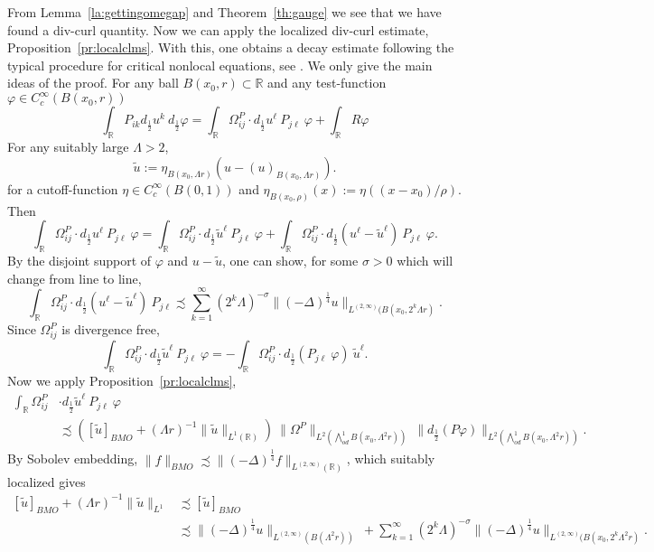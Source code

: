 \documentclass[12pt]{amsart}
\theoremstyle{definition}
\newcommand{\R}{\mathbb{R}}
\newcommand{\brac}[1]{\left (#1 \right )}
\newcommand{\Ep}{\bigwedge\nolimits}
\numberwithin{theorem}{section} \numberwithin{equation}{section}
\newcommand{\lap}{\Delta }
\newcommand{\aleq}{\precsim}
\newcommand{\lapv}{(-\lap)^{\frac{1}{4}}}
\begin{document}
% 
From Lemma~\ref{la:gettingomegap} and Theorem~\ref{th:gauge} we see that we have found a div-curl quantity. Now we can apply the localized div-curl estimate, Proposition~\ref{pr:localclms}. With this, one obtains a decay estimate following the typical procedure for critical nonlocal equations, see \cite{DaLio-Riviere-1Dmfd,DaLio-2013,Schikorra-eps}. We only give the main ideas of the proof. For any ball $B(x_0,r) \subset \R$ and any test-function $\varphi \in C_c^\infty(B(x_0,r))$
\[
 \int_{\R} P_{ik} d_{\frac{1}{2}} u^k\ d_{\frac{1}{2}} \varphi = \int_{\R} \Omega_{ij}^P \cdot d_{\frac{1}{2}}u^\ell\ P_{j\ell}\ \varphi + \int_{\R} R \varphi
\]
For any suitably large $\Lambda > 2$,
\[
 \tilde{u} := \eta_{B(x_0,\Lambda r)} (u-(u)_{B(x_0,\Lambda r)}).
\]
for a cutoff-function $\eta \in C_c^\infty(B(0,1))$ and $\eta_{B(x_0,\rho)}(x) := \eta((x-x_0)/\rho)$. Then
\[
\int_{\R} \Omega_{ij}^P \cdot d_{\frac{1}{2}}u^\ell\ P_{j\ell}\ \varphi =\int_{\R} \Omega_{ij}^P \cdot d_{\frac{1}{2}}\tilde{u}^\ell\ P_{j\ell}\ \varphi + \int_{\R} \Omega_{ij}^P \cdot d_{\frac{1}{2}} \brac{u^\ell-\tilde{u}^\ell}\ P_{j\ell}\ \varphi.
\]
By the disjoint support of $\varphi$ and $u-\tilde{u}$, one can show, for some $\sigma >0$ which will change from line to line,
\[
 \int_{\R} \Omega_{ij}^P \cdot d_{\frac{1}{2}} \brac{u^\ell-\tilde{u}^\ell}\ P_{j\ell} \aleq \sum_{k=1}^\infty (2^k \Lambda)^{-\sigma} \|\lapv u\|_{L^{(2,\infty)}(B(x_0,2^k \Lambda r)}.
\]
Since $\Omega^P_{ij}$ is divergence free,
\[
 \int_{\R} \Omega_{ij}^P \cdot d_{\frac{1}{2}}\tilde{u}^\ell\ P_{j\ell}\ \varphi = -\int_{\R} \Omega_{ij}^P \cdot d_{\frac{1}{2}}\brac{P_{j\ell}\ \varphi}\ \tilde{u}^\ell.
\]
Now we apply Proposition~\ref{pr:localclms},
\[
\begin{split}
  \int_{\R} \Omega_{ij}^P &\cdot d_{\frac{1}{2}}\tilde{u}^\ell\ P_{j\ell}\ \varphi\\
  &\aleq \brac{[\tilde{u}]_{BMO} + (\Lambda r)^{-1} \|\tilde{u}\|_{L^1(\R)}}\ \|\Omega^P\|_{L^2(\Ep^1_{od} B(x_0,\Lambda^2 r))}\ \| d_{\frac{1}{2}}\brac{P \varphi}\|_{L^2(\Ep^1_{od} B(x_0,\Lambda^2 r))}.
\end{split}
  \]
By Sobolev embedding, $\|f\|_{BMO} \aleq \|\lapv f\|_{L^{(2,\infty)}(\R)}$, which suitably localized gives
\[
\begin{split}
 [\tilde{u}]_{BMO} + (\Lambda r)^{-1} \|\tilde{u}\|_{L^1}& \aleq [\tilde{u}]_{BMO} \\
 &\aleq \|\lapv u\|_{L^{(2,\infty)}(B(\Lambda^2 r))}\ + \sum_{k=1}^\infty (2^k \Lambda)^{-\sigma} \|\lapv u\|_{L^{(2,\infty)}(B(x_0,2^k \Lambda^2 r)}. 
\end{split}
 \]
\end{document}
